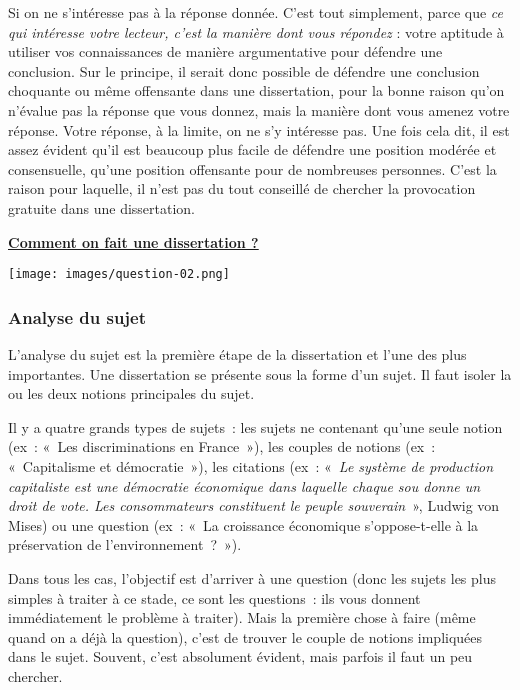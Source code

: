 \documentclass[
  letterpaper,
  DIV=11,
  numbers=noendperiod]{scrartcl}
\begin{document}
Si on ne s'intéresse pas à la réponse donnée. C'est tout simplement,
parce que \emph{ce qui intéresse votre lecteur, c'est la manière dont
vous répondez} : votre aptitude à utiliser vos connaissances de manière
argumentative pour défendre une conclusion. Sur le principe, il serait
donc possible de défendre une conclusion choquante ou même offensante
dans une dissertation, pour la bonne raison qu'on n'évalue pas la
réponse que vous donnez, mais la manière dont vous amenez votre réponse.
Votre réponse, à la limite, on ne s'y intéresse pas. Une fois cela dit,
il est assez évident qu'il est beaucoup plus facile de défendre une
position modérée et consensuelle, qu'une position offensante pour de
nombreuses personnes. C'est la raison pour laquelle, il n'est pas du
tout conseillé de chercher la provocation gratuite dans une
dissertation.

\ul{\textbf{Comment on fait une dissertation ?}}

\begin{center}
\texttt{[image: images/question-02.png]}
\end{center}

\subsubsection{Analyse du sujet}\label{analyse-du-sujet}

L'analyse du sujet est la première étape de la dissertation et l'une des
plus importantes. Une dissertation se présente sous la forme d'un sujet.
Il faut isoler la ou les deux notions principales du sujet.

Il y a quatre grands types de sujets~: les sujets ne contenant qu'une
seule notion (ex~: «~Les discriminations en France~»), les couples de
notions (ex~: «~Capitalisme et démocratie~»), les citations (ex~:
«~\emph{Le système de production capitaliste est une démocratie
économique dans laquelle chaque sou donne un droit de vote. Les
consommateurs constituent le peuple souverain}~», Ludwig von Mises) ou
une question (ex~: «~La croissance économique s'oppose-t-elle à la
préservation de l'environnement~?~»).

Dans tous les cas, l'objectif est d'arriver à une question (donc les
sujets les plus simples à traiter à ce stade, ce sont les questions~:
ils vous donnent immédiatement le problème à traiter). Mais la première
chose à faire (même quand on a déjà la question), c'est de trouver le
couple de notions impliquées dans le sujet. Souvent, c'est absolument
évident, mais parfois il faut un peu chercher.
\end{document}
